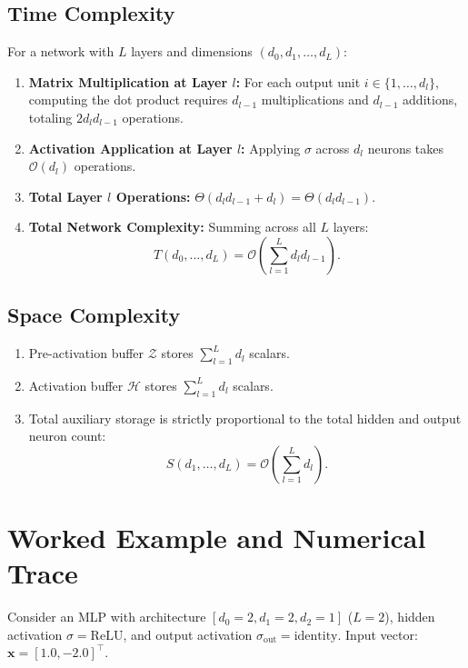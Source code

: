 \documentclass[11pt]{article}
\begin{document}
\subsection{Time Complexity}
For a network with $L$ layers and dimensions $(d_0, d_1, \dots, d_L)$:
\begin{enumerate}
    \item \textbf{Matrix Multiplication at Layer $l$:} For each output unit $i \in \{1, \dots, d_l\}$, computing the dot product requires $d_{l-1}$ multiplications and $d_{l-1}$ additions, totaling $2 d_l d_{l-1}$ operations.
    \item \textbf{Activation Application at Layer $l$:} Applying $\sigma$ across $d_l$ neurons takes $\mathcal{O}(d_l)$ operations.
    \item \textbf{Total Layer $l$ Operations:} $\Theta(d_l d_{l-1} + d_l) = \Theta(d_l d_{l-1})$.
    \item \textbf{Total Network Complexity:} Summing across all $L$ layers:
    \begin{equation}
    T(d_0, \dots, d_L) = \mathcal{O}\left( \sum_{l=1}^L d_l d_{l-1} \right).
    \end{equation}
\end{enumerate}

\subsection{Space Complexity}
\begin{enumerate}
    \item Pre-activation buffer $\mathcal{Z}$ stores $\sum_{l=1}^L d_l$ scalars.
    \item Activation buffer $\mathcal{H}$ stores $\sum_{l=1}^L d_l$ scalars.
    \item Total auxiliary storage is strictly proportional to the total hidden and output neuron count:
    \begin{equation}
    S(d_1, \dots, d_L) = \mathcal{O}\left( \sum_{l=1}^L d_l \right).
    \end{equation}
\end{enumerate}

\section{Worked Example and Numerical Trace}
\label{sec:worked_example}

Consider an MLP with architecture $[d_0=2, d_1=2, d_2=1]$ ($L=2$), hidden activation $\sigma = \text{ReLU}$, and output activation $\sigma_{\text{out}} = \text{identity}$.
Input vector: $\mathbf{x} = [1.0, -2.0]^\top$.
\end{document}
